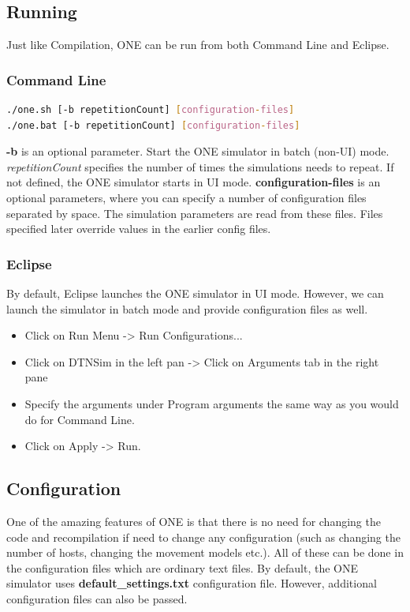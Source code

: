 \subsection{Running}
Just like Compilation, ONE can be run from both Command Line and Eclipse.

\subsubsection{Command Line}
\begin{lstlisting}[language=bash]
./one.sh [-b repetitionCount] [configuration-files]
./one.bat [-b repetitionCount] [configuration-files]
\end{lstlisting}

\textbf{-b} is an optional parameter. Start the ONE simulator in batch (non-UI) mode. \textit{repetitionCount} specifies the number of times the simulations needs to repeat. If not defined, the ONE simulator starts in UI mode.\newline
\textbf{configuration-files} is an optional parameters, where you can specify a number of configuration files separated by space. The simulation parameters are read from these files. Files specified later override values in the earlier config files.\newline

\subsubsection{Eclipse}
By default, Eclipse launches the ONE simulator in UI mode. However, we can launch the simulator in batch mode and provide configuration files as well.
\begin{itemize}
  \item Click on Run Menu -> Run Configurations...
  \item Click on DTNSim in the left pan -> Click on Arguments tab in the right pane
  \item Specify the arguments under Program arguments the same way as you would do for Command Line.
  \item Click on Apply -> Run.
\end{itemize}

\subsection{Configuration}
\label{one:configuration}
One of the amazing features of ONE is that there is no need for changing the code and recompilation if need to change any configuration (such as changing the number of hosts, changing the movement models etc.). All of these can be done in the configuration files which are ordinary text files. By default, the ONE simulator uses \textbf{default\_settings.txt} configuration file. However, additional configuration files can also be passed.

